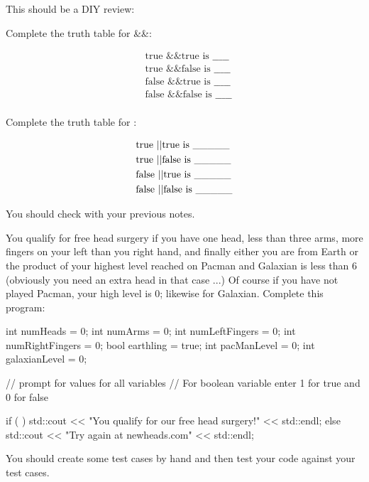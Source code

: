This should be a DIY review:

\begin{ex}
Complete the truth table for \&\&:

\begin{align*}
& \text{true \&\& true is \_\_\_\_\_}\\
& \text{true \&\& false is \_\_\_\_\_}\\
& \text{false \&\& true is \_\_\_\_\_}\\
& \text{false \&\& false is \_\_\_\_\_}\\
\end{align*}
\end{ex}

\begin{ex}
Complete the truth table for \textbar\textbar:

\begin{align*}
& \text{true \textbar\textbar true is \_\_\_\_\_}\\
& \text{true \textbar\textbar false is \_\_\_\_\_}\\
& \text{false \textbar\textbar true is \_\_\_\_\_}\\
& \text{false \textbar\textbar false is \_\_\_\_\_}\\
\end{align*}
\end{ex}
You should check with your previous notes.

\begin{ex}
You qualify for free head surgery if you have one
head, less than three arms, more fingers on your left than you right
hand, and finally either you are from Earth or the product of your
highest level reached on Pacman and Galaxian is less than 6 (obviously
you need an extra head in that case ...) Of course if you have not
played Pacman, your high level is 0; likewise for Galaxian. Complete
this program:
\begin{console}
int numHeads = 0;
int numArms = 0;
int numLeftFingers = 0;
int numRightFingers = 0;
bool earthling = true;
int pacManLevel = 0;
int galaxianLevel = 0;

// prompt for values for all variables
// For boolean variable enter 1 for true and 0 for false

if (                             )
std::cout << "You qualify for our free head surgery!"
          << std::endl;
else
std::cout << "Try again at newheads.com" << std::endl;
\end{console}
\end{ex}
You should create some test cases by hand and then test your code
against your test cases.

